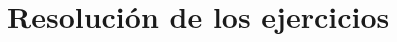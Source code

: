 \documentclass[10pt, a4paper]{article}
\begin{document}
\section{Resolución de los ejercicios}
\subsection{}
\subsection{}
\subsection{}
\subsection{}
\subsection{}
\subsection{}
\subsection{}
\end{document}
